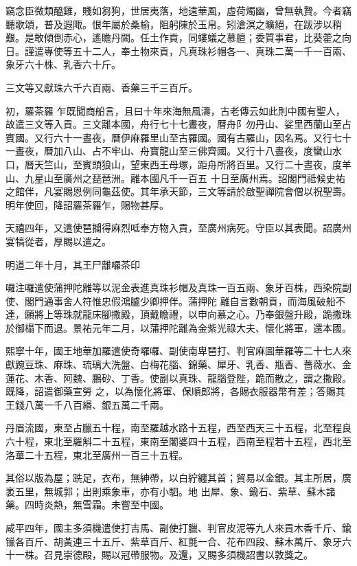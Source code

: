 \begin{pinyinscope}
 竊念臣微類醯雞，賤如芻狗，世居夷落，地遠華風，虛荷燭幽，曾無執贄。今者竊聽歌頌，普及遐陬。恨年屬於桑榆，阻躬陳於玉帛。矧滄溟之曠絕，在跋涉以稍艱。是敢傾倒赤心，遙瞻丹闕。任土作貢，同螻蟻之慕膻；委質事君，比葵藿之向日。謹遣專使等五十二人，奉土物來貢，凡真珠衫帽各一、真珠二萬一千一百兩、象牙六十株、乳香六十斤。



 三文等又獻珠六千六百兩、香藥三千三百斤。



 初，羅茶羅
 乍既聞商船言，且曰十年來海無風濤，古老傳云如此則中國有聖人，故遣三文等入貢。三文離本國，舟行七十七晝夜，曆舟阝勿丹山、娑里西蘭山至占賓國。又行六十一晝夜，曆伊麻羅里山至古羅國。國有古羅山，因名焉。又行七十一晝夜，曆加八山、占不牢山、舟寶龍山至三佛齊國。又行十八晝夜，度蠻山水口，曆天竺山，至賓頭狼山，望東西王母塚，距舟所將百里。又行二十晝夜，度羊山、九星山至廣州之琵琶洲。離本國凡千一百五
 十日至廣州焉。詔閣門祗候史祐之館伴，凡宴賜恩例同龜茲使。其年承天節，三文等請於啟聖禪院會僧以祝聖壽。明年使回，降詔羅茶羅乍，賜物甚厚。



 天禧四年，又遣使琶攔得麻烈呧奉方物入貢，至廣州病死。守臣以其表聞。詔廣州宴犒從者，厚賜以遣之。



 明道二年十月，其王尸離囉茶印
 
  
   
  
 
 囉注囉遣使蒲押陀離等以泥金表進真珠衫帽及真珠一百五兩、象牙百株，西染院副使、閣門通事舍人符惟忠假鴻臚少卿押伴。蒲押陀
 離自言數朝貢，而海風破船不達，願將上等珠就龍床腳撒殿，頂戴瞻禮，以申向慕之心。乃奉銀盤升殿，跪撒珠於御榻下而退。景祐元年二月，以蒲押陀離為金紫光祿大夫、懷化將軍，還本國。



 熙寧十年，國王地華加羅遣使奇囉囉、副使南卑琶打、判官麻圖華羅等二十七人來獻踠豆珠、麻珠、琉璃大洗盤、白梅花腦、錦藥、犀牙、乳香、瓶香、薔薇水、金蓮花、木香、阿魏、鵬砂、丁香。使副以真珠、龍腦登陛，跪而散之，謂之撒殿。既降，詔遣御藥宣勞
 之，以為懷化將軍、保順郎將，各賜衣服器幣有差；答賜其王錢八萬一千八百緡、銀五萬二千兩。



 丹眉流國，東至占臘五十程，南至羅越水路十五程，西至西天三十五程，北至程良六十程，東北至羅斛二十五程，東南至闍婆四十五程，西南至程若十五程，西北至洛華二十五程，東北至廣州一百三十五程。



 其俗以版為屋；跣足，衣布，無紳帶，以白紵纏其首；貿易以金銀。其主所居，廣袤五里，無城郭；出則乘象車，亦有小駟。地
 出犀、象、鍮石、紫草、蘇木諸藥。四時炎熱，無雪霜。未嘗至中國。



 咸平四年，國主多須機遣使打吉馬、副使打臘、判官皮泥等九人來貢木香千斤、鍮镴各百斤、胡黃連三十五斤、紫草百斤、紅氈一合、花布四段、蘇木萬斤、象牙六十一株。召見崇德殿，賜以冠帶服物。及還，又賜多須機詔書以敦獎之。



\end{pinyinscope}